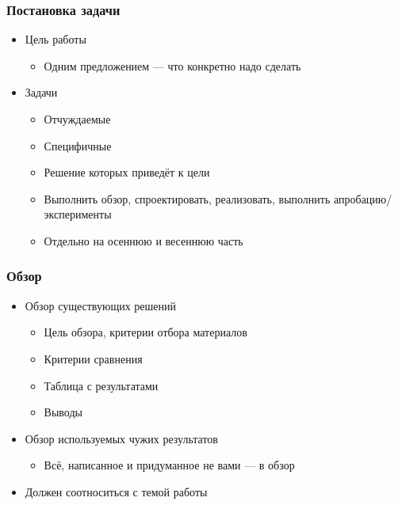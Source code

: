 \documentclass[xetex,mathserif,serif]{beamer}
\begin{document}
    \begin{frame}
        \frametitle{Постановка задачи}
        \begin{itemize}
            \item Цель работы
            \begin{itemize}
                \item Одним предложением --- что конкретно надо сделать
            \end{itemize}
            \item Задачи
            \begin{itemize}
                \item Отчуждаемые
                \item Специфичные
                \item Решение которых приведёт к цели
                \item Выполнить обзор, спроектировать, реализовать, выполнить апробацию/эксперименты
                \item Отдельно на осеннюю и весеннюю часть
            \end{itemize}
        \end{itemize}
    \end{frame}

    \begin{frame}
        \frametitle{Обзор}
        \begin{itemize}
            \item Обзор существующих решений
            \begin{itemize}
                \item Цель обзора, критерии отбора материалов
                \item Критерии сравнения
                \item Таблица с результатами
                \item Выводы
            \end{itemize}
            \item Обзор используемых чужих результатов
            \begin{itemize}
                \item  Всё, написанное и придуманное не вами --- в обзор
            \end{itemize}
            \item Должен соотноситься с темой работы
        \end{itemize}
    \end{frame}
\end{document}
